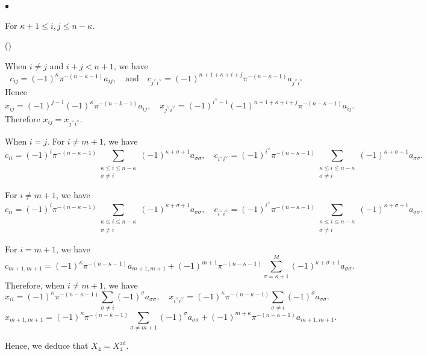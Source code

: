 \documentclass[pdflatex,sn-mathphys-num]{sn-jnl}%
\theoremstyle{thmstyleone}%
\theoremstyle{thmstyletwo}%
\numberwithin{equation}{subsection}
\theoremstyle{thmstylethree}%
\newcommand{\ad}{\mathrm{ad}}
\newenvironment{altenumerate}
	{\begin{list}
			{(\theenumi) }
			{\usecounter{enumi}
				\setlength{\labelwidth}{0pt}
				\setlength{\labelsep}{0pt}
				\setlength{\leftmargin}{0pt}
				\setlength{\itemsep}{\the\smallskipamount}
				\renewcommand{\theenumi}{\roman{enumi}}
		}}
		{\end{list}}
\newenvironment{altitemize}
	{\begin{list}
			{$\bullet$}
			{\setlength{\labelwidth}{0pt}
				\setlength{\itemindent}{5pt}
				\setlength{\labelsep}{5pt}
				\setlength{\leftmargin}{0pt}
				\setlength{\itemsep}{\the\smallskipamount}
		}}
		{\end{list}}
\begin{document}
\begin{altitemize}
\item 
For $\kappa+1\leq i,j\leq n-\kappa$.
\begin{altenumerate}
\item When $i\neq j$ and $i+j<n+1$, we have
\begin{equation*}
c_{ij}=(-1)^\kappa\pi^{-(n-\kappa-1)}a_{ij},
\quad\text{and}\quad
c_{j^\vee i^\vee}=(-1)^{n+1+\kappa+i+j}\pi^{-(n-\kappa-1)}a_{j^\vee i^\vee}
\end{equation*}
Hence
\begin{equation*}
x_{ij}=(-1)^{j-1}(-1)^\kappa\pi^{-(n-k-1)}a_{ij},
\quad
x_{j^\vee i^\vee}=(-1)^{i^\vee-1}(-1)^{n+1+\kappa+i+j}\pi^{-(n-\kappa-1)}a_{ij}.
\end{equation*}
Therefore $x_{ij}=x_{j^\vee i^\vee}$.
\item When $i=j$.
For $i\neq m+1$, we have
\begin{equation*}
c_{ii}=(-1)^i\pi^{-(n-\kappa-1)}\sum_{\substack{\kappa\leq i\leq n-\kappa\\\sigma\neq i }} (-1)^{\kappa+\sigma+1}a_{\sigma\sigma},
\quad
c_{i^\vee i^\vee}=(-1)^{i^\vee}\pi^{-(n-\kappa-1)}\sum_{\substack{\kappa\leq i\leq n-\kappa\\\sigma\neq i }} (-1)^{\kappa+\sigma+1}a_{\sigma\sigma}.
\end{equation*}
					
For $i\neq m+1$, we have
\begin{equation*}
c_{ii}=(-1)^i\pi^{-(n-\kappa-1)}\sum_{\substack{\kappa\leq i\leq n-\kappa\\\sigma\neq i }} (-1)^{\kappa+\sigma+1}a_{\sigma\sigma},
\quad
c_{i^\vee i^\vee}=(-1)^{i^\vee}\pi^{-(n-\kappa-1)}\sum_{\substack{\kappa\leq i\leq n-\kappa\\\sigma\neq i }} (-1)^{\kappa+\sigma+1}a_{\sigma\sigma}.
\end{equation*}
					
For $i=m+1$, we have
\begin{equation*}
c_{m+1,m+1}=(-1)^\kappa\pi^{-(n-\kappa-1)}a_{m+1,m+1}+(-1)^{m+1}\pi^{-(n-\kappa-1)}\sum_{\sigma=\kappa+1}^M (-1)^{\kappa+\sigma+1}a_{\sigma\sigma}.
\end{equation*}
Therefore, when $i\neq m+1$, we have
\begin{equation*}
x_{ii}=(-1)^{\kappa}\pi^{-(n-\kappa-1)}\sum_{\sigma\neq i}(-1)^\sigma a_{\sigma\sigma},
\quad
x_{i^\vee i^\vee}=(-1)^{\kappa}\pi^{-(n-\kappa-1)}\sum_{\sigma\neq i}(-1)^\sigma a_{\sigma\sigma}.
\end{equation*}
\begin{equation*}
x_{m+1,m+1}=(-1)^{\kappa}\pi^{-(n-\kappa-1)}\sum_{\sigma\neq m+1}(-1)^\sigma a_{\sigma\sigma}+(-1)^{m+\kappa}\pi^{-(n-\kappa-1)}a_{m+1,m+1}.
\end{equation*}
\end{altenumerate}
Hence, we deduce that $X_4=X_4^{\ad}$.
				

\end{altitemize}
\end{document}
